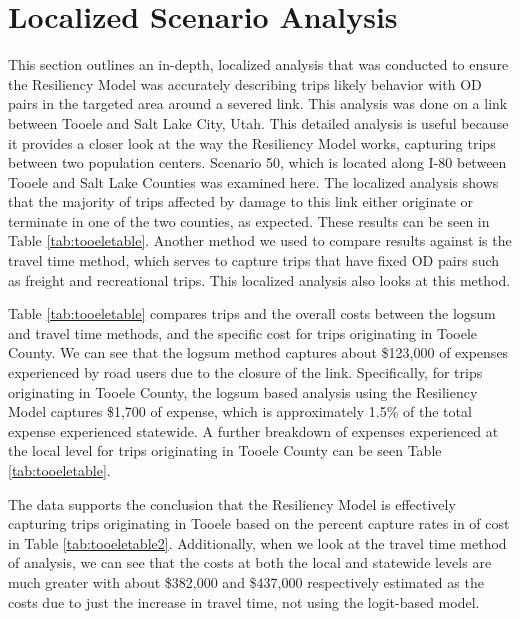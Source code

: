 \section{Localized Scenario Analysis}

This section outlines an in-depth, localized analysis that was conducted to ensure
the Resiliency Model was accurately describing trips likely behavior with OD pairs in the
targeted area around a severed link. This analysis was done on a link between
Tooele and Salt Lake City, Utah. This detailed analysis is useful because it
provides a closer look at the way the Resiliency Model works, capturing trips
between two population centers. Scenario 50, which is located along I-80 between Tooele and Salt Lake Counties
was examined here. The localized analysis shows that the majority of trips
affected by damage to this link either originate or terminate in one of the
two counties, as expected. These results can be seen in Table
\ref{tab:tooeletable}. Another method we used to compare results against is
the travel time method,
which serves to capture trips that have fixed OD pairs such as freight and
recreational trips. This localized analysis also looks at this method.

Table \ref{tab:tooeletable} compares trips and the overall costs between the
logsum and travel time methods, and the specific cost for trips originating in
Tooele County. We can see that the logsum
method captures about
\$123,000 of expenses experienced by road users due to the closure of the
link. Specifically, for trips originating in Tooele County, the logsum based analysis using the Resiliency
Model captures \$1,700 of
expense, which is approximately 1.5\% of the total expense experienced
statewide. A further breakdown of expenses experienced at the local level
for trips originating in Tooele County
can be seen Table \ref{tab:tooeletable}.

The data supports the conclusion that the Resiliency Model is effectively
capturing trips originating in Tooele based on the percent capture
rates in of cost in Table \ref{tab:tooeletable2}. Additionally, when we look at the
travel time method of analysis, we can see that the costs at both the local and
statewide levels are much greater with about \$382,000 and \$437,000
respectively estimated as the costs due to just the increase in travel time, not using
the logit-based model.

